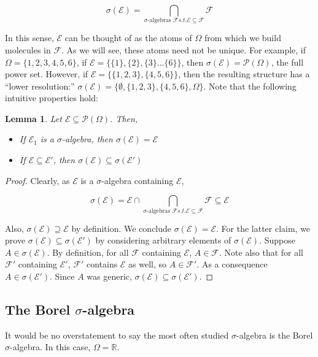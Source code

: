 \documentclass{report}
\newcommand{\F}{\mathcal F}
\newcommand{\E}{\mathcal E}
\newcommand{\Power}{\mathcal P}
\newtheorem{lemma}[theorem]{Lemma}
\begin{document}
\[ \sigma(\E) = \bigcap_{\text{$\sigma$-algebras } \F s.t. \E \subseteq \F}\F \]

In this sense, $\E$ can be thought of as the atoms of $\Omega$ from which we build 
molecules in $\mathcal F$. As we will see, these atoms need not be unique. For example, if 
$\Omega = \{1,2,3,4,5,6\}$, if $\E = \{\{1\},\{2\},\{3\}...\{6\}\}$, then $\sigma(\E) = \Power(\Omega)$, the 
full power set. However, if $\E = \{\{1,2,3\}, \{4,5,6\}\}$, then the resulting structure has a ``lower resolution:''
 $\sigma(\E) = \{\emptyset, \{1,2,3\},\{4,5,6\}, \Omega\}$. Note that the following 
 intuitive properties hold: 

 \begin{lemma}
    Let $\E \subseteq \Power(\Omega)$. Then, 
    \begin{itemize}
        \item If $\E_1$ is a $\sigma$-algebra, then $\sigma(\E) = \E$ 
        \item If $\E \subseteq \E'$, then $\sigma(\E) \subseteq \sigma(\E')$
    \end{itemize}
\end{lemma}

\begin{proof}
    Clearly, as $\E$ is a $\sigma$-algebra containing $\E$, 

    \[ \sigma(\E) = \E \cap \bigcap_{\text{$\sigma$-algebras } \F s.t. \E \subseteq \F}\F \subseteq \E \]

    Also, $\sigma(\E) \supseteq \E$ by definition. We conclude $\sigma(\E) = \E$. For the latter claim, 
    we prove $\sigma(\E) \subseteq \sigma(\E')$ by considering arbitrary elements of 
    $\sigma(\E)$. Suppose $A \in \sigma(\E)$. By definition, for all $\F$ containing $\E$, $A \in \F$. 
    Note also that for all $\F'$ containing $\E'$, $\F'$ contains $\E$ as well, so $A \in \F'$. 
    As a consequence $A \in \sigma(\E')$. Since $A$ was generic, $\sigma(\E) \subseteq \sigma(\E')$.


\end{proof}


\subsection{The Borel $\sigma$-algebra}

It would be no overstatement to say the most often studied $\sigma$-algebra is the 
Borel $\sigma$-algebra. In this case, $\Omega = \mathbb R$. 
\end{document}
